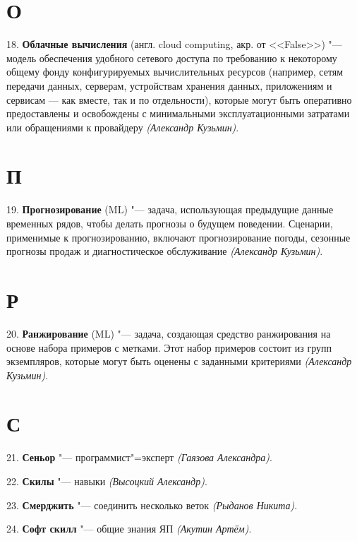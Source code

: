 \documentclass{article}
\begin{document}
\section*{О}

\hspace{0.42cm} 18. \textbf{Облачные вычисления} (англ. cloud computing, акр. от
<<False>>) "--- модель обеспечения удобного сетевого доступа по требованию к
некоторому общему фонду конфигурируемых вычислительных ресурсов (например, сетям
передачи данных, серверам, устройствам хранения данных, приложениям и сервисам —
как вместе, так и по отдельности), которые могут быть оперативно предоставлены и
освобождены с минимальными эксплуатационными затратами или обращениями к
провайдеру \textit{(Александр Кузьмин)}.

\section*{П}

\hspace{0.37cm} 19. \textbf{Прогнозирование} (ML) "--- задача, использующая предыдущие данные
временных рядов, чтобы делать прогнозы о будущем поведении. Сценарии, применимые
к прогнозированию, включают прогнозирование погоды, сезонные прогнозы продаж и
диагностическое обслуживание \textit{(Александр Кузьмин)}.

\section*{Р}

\hspace{0.37cm} 20. \textbf{Ранжирование} (ML) "--- задача, создающая средство ранжирования на
основе набора примеров с метками. Этот набор примеров состоит из групп
экземпляров, которые могут быть оценены с заданными критериями
\textit{(Александр Кузьмин)}.

\section*{С}

\hspace{0.42cm} 21. \textbf{Сеньор} "--- программист"=эксперт \textit{(Гаязова
Александра)}.

22. \textbf{Скилы} "--- навыки \textit{(Высоцкий Александр)}.

23. \textbf{Смерджить} "--- соединить несколько веток \textit{(Рыданов Никита)}.

24. \textbf{Софт скилл} "--- общие знания ЯП \textit{(Акутин Артём)}.
\end{document}
